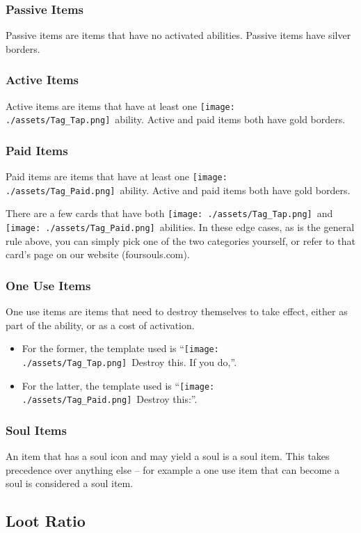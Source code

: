 \documentclass[10pt, a4paper, twoside]{article} %
\newcommand{\tap}{\texttt{[image: ./assets/Tag\_Tap.png]}}
\newcommand{\pay}{\texttt{[image: ./assets/Tag\_Paid.png]}}
\begin{document}
    \subsubsection*{Passive Items}
    Passive items are items that have no activated abilities. Passive items have silver borders.
    \subsubsection*{Active Items}
    Active items are items that have at least one \tap\ ability. Active and paid items both have gold borders.
    \subsubsection*{Paid Items}
    Paid items are items that have at least one \pay\ ability. Active and paid items both have gold borders.

    There are a few cards that have both \tap\ and \pay\ abilities. In these edge cases, as is the general rule above, you can simply pick one of the two categories yourself, or refer to that card’s page on our website (foursouls.com).
    \subsubsection*{One Use Items}
    One use items are items that need to destroy themselves to take effect, either as part of the ability, or as a cost of activation.
    \begin{itemize}
        \item For the former, the template used is “\tap\ Destroy this. If you do,”.
        \item For the latter, the template used is “\pay\ Destroy this:”.
    \end{itemize}

    \subsubsection*{Soul Items}
    An item that has a soul icon and may yield a soul is a soul item. This takes precedence over anything else – for example a one use item that can become a soul is considered a soul item.

    \subsection{Loot Ratio}
\end{document}

